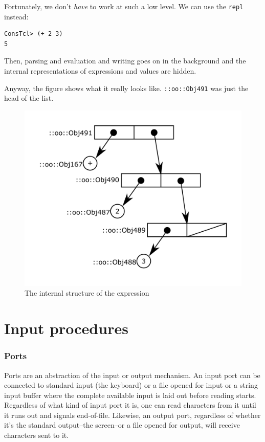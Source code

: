 \documentclass[twoside]{report}
\begin{document}
Fortunately, we don't \emph{have} to work at such a low level. We can use the \texttt{repl} instead:

\begin{verbatim}
ConsTcl> (+ 2 3)
5
\end{verbatim}

Then, parsing and evaluation and writing goes on in the background and the internal representations of expressions and values are hidden.

Anyway, the figure shows what it really looks like. \texttt{::oo::Obj491} was just the head of the list.

\begin{figure}[h!]\includegraphics{images/intreplist.png}\captionsetup{labelformat=empty}\caption{The internal structure of the expression}\label{fig:the-internal-structure-of-the-expression}\end{figure}

\section{Input procedures}
\label{input-procedures}

\begin{pulledtext}

\subsubsection{Ports}
\label{ports}

Ports are an abstraction of the input or output mechanism. An input port can be connected to standard input (the keyboard) or a file opened for input or a string input buffer where the complete available input is laid out before reading starts. Regardless of what kind of input port it is, one can read characters from it until it runs out and signals end-of-file. Likewise, an output port, regardless of whether it's the standard output--the screen--or a file opened for output, will receive characters sent to it.
\end{pulledtext}
\end{document}
